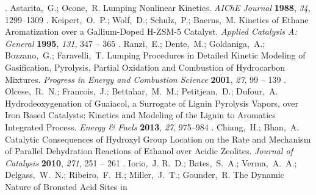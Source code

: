 \documentclass[journal=iecred,manuscript=article]{achemso}
\begin{document}
{\begin{mcitethebibliography}
{\mcitedefaultendpunct}{\mcitedefaultseppunct}\relax
\unskip.
Astarita,~G.; Ocone,~R. Lumping Nonlinear Kinetics. \emph{AIChE Journal}
  \textbf{1988}, \emph{34}, 1299--1309\relax
\mciteBstWouldAddEndPuncttrue
\mciteSetBstMidEndSepPunct{\mcitedefaultmidpunct}
{\mcitedefaultendpunct}{\mcitedefaultseppunct}\relax
\unskip.
Keipert,~O.~P.; Wolf,~D.; Schulz,~P.; Baerns,~M. Kinetics of Ethane
  Aromatization over a Gallium-Doped H-ZSM-5 Catalyst. \emph{Applied Catalysis
  A: General} \textbf{1995}, \emph{131}, 347 -- 365\relax
\mciteBstWouldAddEndPuncttrue
\mciteSetBstMidEndSepPunct{\mcitedefaultmidpunct}
{\mcitedefaultendpunct}{\mcitedefaultseppunct}\relax
\unskip.
Ranzi,~E.; Dente,~M.; Goldaniga,~A.; Bozzano,~G.; Faravelli,~T. Lumping
  Procedures in Detailed Kinetic Modeling of Gasification, Pyrolysis, Partial
  Oxidation and Combustion of Hydrocarbon Mixtures. \emph{Progress in Energy
  and Combustion Science} \textbf{2001}, \emph{27}, 99 -- 139\relax
\mciteBstWouldAddEndPuncttrue
\mciteSetBstMidEndSepPunct{\mcitedefaultmidpunct}
{\mcitedefaultendpunct}{\mcitedefaultseppunct}\relax
\unskip.
Olcese,~R.~N.; Francois,~J.; Bettahar,~M.~M.; Petitjean,~D.; Dufour,~A.
  Hydrodeoxygenation of Guaiacol, a Surrogate of Lignin Pyrolysis Vapors, over
  Iron Based Catalysts: Kinetics and Modeling of the Lignin to Aromatics
  Integrated Process. \emph{Energy \& Fuels} \textbf{2013}, \emph{27},
  975--984\relax
\mciteBstWouldAddEndPuncttrue
\mciteSetBstMidEndSepPunct{\mcitedefaultmidpunct}
{\mcitedefaultendpunct}{\mcitedefaultseppunct}\relax
\unskip.
Chiang,~H.; Bhan,~A. Catalytic Consequences of Hydroxyl Group Location on the
  Rate and Mechanism of Parallel Dehydration Reactions of Ethanol over Acidic
  Zeolites. \emph{Journal of Catalysis} \textbf{2010}, \emph{271}, 251 --
  261\relax
\mciteBstWouldAddEndPuncttrue
\mciteSetBstMidEndSepPunct{\mcitedefaultmidpunct}
{\mcitedefaultendpunct}{\mcitedefaultseppunct}\relax
\unskip.
Iorio,~J. R.~D.; Bates,~S.~A.; Verma,~A.~A.; Delgass,~W.~N.; Ribeiro,~F.~H.;
  Miller,~J.~T.; Gounder,~R. The Dynamic Nature of Bronsted Acid Sites in

\end{mcitethebibliography}}
\end{document}
